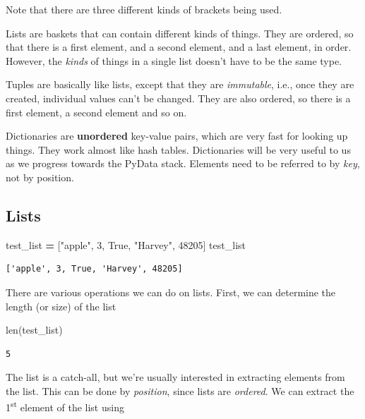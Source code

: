 \documentclass[
  letterpaper,
]{scrbook}
\newenvironment{Shaded}{\begin{snugshade}}{\end{snugshade}}
\newcommand{\BuiltInTok}[1]{#1}
\newcommand{\DecValTok}[1]{\textcolor[rgb]{0.00,0.00,0.81}{#1}}
\newcommand{\NormalTok}[1]{#1}
\newcommand{\OperatorTok}[1]{\textcolor[rgb]{0.81,0.36,0.00}{\textbf{#1}}}
\newcommand{\StringTok}[1]{\textcolor[rgb]{0.31,0.60,0.02}{#1}}
\newcommand{\VariableTok}[1]{\textcolor[rgb]{0.00,0.00,0.00}{#1}}
\begin{document}
Note that there are three different kinds of brackets being used.

Lists are baskets that can contain different kinds of things. They are ordered, so that there is a first element, and a second element, and a last element, in order. However, the \emph{kinds} of things in a single list doesn't have to be the same type.

Tuples are basically like lists, except that they are \emph{immutable}, i.e., once they are created, individual values can't be changed. They are also ordered, so there is a first element, a second element and so on.

Dictionaries are \textbf{unordered} key-value pairs, which are very fast for looking up things. They work almost like hash tables. Dictionaries will be very useful to us as we progress towards the PyData stack. Elements need to be referred to by \emph{key}, not by position.

\hypertarget{lists}{%
\subsection{Lists}\label{lists}}

\begin{Shaded}
\begin{Highlighting}[]
\NormalTok{test_list }\OperatorTok{=}\NormalTok{ [}\StringTok{"apple"}\NormalTok{, }\DecValTok{3}\NormalTok{, }\VariableTok{True}\NormalTok{, }\StringTok{"Harvey"}\NormalTok{, }\DecValTok{48205}\NormalTok{]}
\NormalTok{test_list}
\end{Highlighting}
\end{Shaded}

\begin{verbatim}
['apple', 3, True, 'Harvey', 48205]
\end{verbatim}

There are various operations we can do on lists. First, we can determine the length (or size) of the list

\begin{Shaded}
\begin{Highlighting}[]
\BuiltInTok{len}\NormalTok{(test_list)}
\end{Highlighting}
\end{Shaded}

\begin{verbatim}
5
\end{verbatim}

The list is a catch-all, but we're usually interested in extracting elements from the list. This can be done by \emph{position}, since lists are \emph{ordered}. We can extract the 1\textsuperscript{st} element of the list using
\end{document}
